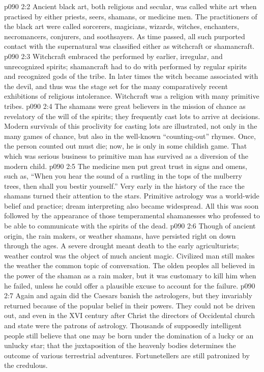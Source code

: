 \vs p090 2:2 Ancient black art, both religious and secular, was called white art when practised by either priests, seers, shamans, or medicine men. The practitioners of the black art were called sorcerers, magicians, wizards, witches, enchanters, necromancers, conjurers, and soothsayers. As time passed, all such purported contact with the supernatural was classified either as witchcraft or shamancraft.
\vs p090 2:3 Witchcraft embraced the  performed by earlier, irregular, and unrecognized spirits; shamancraft had to do with  performed by regular spirits and recognized gods of the tribe. In later times the witch became associated with the devil, and thus was the stage set for the many comparatively recent exhibitions of religious intolerance. Witchcraft was a religion with many primitive tribes.
\vs p090 2:4 The shamans were great believers in the mission of chance as revelatory of the will of the spirits; they frequently cast lots to arrive at decisions. Modern survivals of this proclivity for casting lots are illustrated, not only in the many games of chance, but also in the well\hyp{}known “counting\hyp{}out” rhymes. Once, the person counted out must die; now, he is only  in some childish game. That which was serious business to primitive man has survived as a diversion of the modern child.
\vs p090 2:5 The medicine men put great trust in signs and omens, such as, “When you hear the sound of a rustling in the tops of the mulberry trees, then shall you bestir yourself.” Very early in the history of the race the shamans turned their attention to the stars. Primitive astrology was a world\hyp{}wide belief and practice; dream interpreting also became widespread. All this was soon followed by the appearance of those temperamental shamanesses who professed to be able to communicate with the spirits of the dead.
\vs p090 2:6 Though of ancient origin, the rain makers, or weather shamans, have persisted right on down through the ages. A severe drought meant death to the early agriculturists; weather control was the object of much ancient magic. Civilized man still makes the weather the common topic of conversation. The olden peoples all believed in the power of the shaman as a rain maker, but it was customary to kill him when he failed, unless he could offer a plausible excuse to account for the failure.
\vs p090 2:7 Again and again did the Caesars banish the astrologers, but they invariably returned because of the popular belief in their powers. They could not be driven out, and even in the XVI century after Christ the directors of Occidental church and state were the patrons of astrology. Thousands of supposedly intelligent people still believe that one may be born under the domination of a lucky or an unlucky star; that the juxtaposition of the heavenly bodies determines the outcome of various terrestrial adventures. Fortunetellers are still patronized by the credulous.
